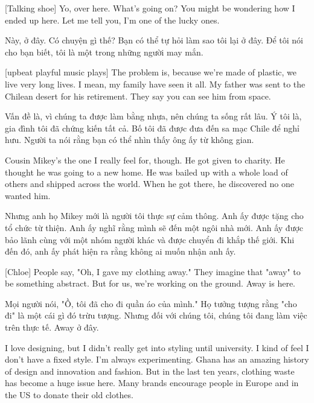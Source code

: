 \documentclass[a4paper]{article}
\begin{document}
	[Talking shoe] Yo, over here.
	What's going on?
	You might be wondering how I ended up here.
	Let me tell you, I'm one of the lucky ones.
	
	\begin{vietnamese-v2}
		 Này, ở đây.
		Có chuyện gì thế?
		Bạn có thể tự hỏi làm sao tôi lại ở đây.
		Để tôi nói cho bạn biết, tôi là một trong những người may mắn.
	\end{vietnamese-v2}
	
	[upbeat playful music plays]
	The problem is, because we're made of plastic, we live very long lives.
	I mean, my family have seen it all.
	My father was sent to the Chilean desert for his retirement.
	They say you can see him from space.
	
	\begin{vietnamese-v2}
		Vấn đề là, vì chúng ta được làm bằng nhựa, nên chúng ta sống rất lâu.
		Ý tôi là, gia đình tôi đã chứng kiến tất cả.
		Bố tôi đã được đưa đến sa mạc Chile để nghỉ hưu.
		Người ta nói rằng bạn có thể nhìn thấy ông ấy từ không gian.
	\end{vietnamese-v2}
	
	Cousin Mikey's the one I really feel for, though.
	He got given to charity.
	He thought he was going to a new home.
	He was bailed up with a whole load of others and shipped across the world.
	When he got there, he discovered no one wanted him.
	
	\begin{vietnamese-v2}
		Nhưng anh họ Mikey mới là người tôi thực sự cảm thông.
		Anh ấy được tặng cho tổ chức từ thiện.
		Anh ấy nghĩ rằng mình sẽ đến một ngôi nhà mới.
		Anh ấy được bảo lãnh cùng với một nhóm người khác và được chuyển đi khắp thế giới.
		Khi đến đó, anh ấy phát hiện ra rằng không ai muốn nhận anh ấy.
	\end{vietnamese-v2}
	
	[Chloe] People say, "Oh, I gave my clothing away."
	They imagine that "away" to be something abstract.
	But for us, we're working on the ground.
	Away is here.
	
	\begin{vietnamese-v2}
		[Chloe] Mọi người nói, "Ồ, tôi đã cho đi quần áo của mình."
		Họ tưởng tượng rằng "cho đi" là một cái gì đó trừu tượng.
		Nhưng đối với chúng tôi, chúng tôi đang làm việc trên thực tế.
		Away ở đây.
	\end{vietnamese-v2}
	
	I love designing, but I didn't really get into styling until university.
	I kind of feel I don't have a fixed style. I'm always experimenting.
	Ghana has an amazing history of design and innovation and fashion.
	But in the last ten years, clothing waste has become a huge issue here.
	Many brands encourage people in Europe and in the US to donate their old clothes.
	
\end{document}
